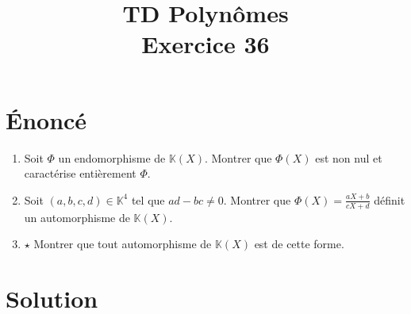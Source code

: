 \documentclass[french]{article}
\title{TD Polynômes \\ Exercice 36}
\date{}
\newcommand{\K}{\mathbb{K}}
\begin{document}
\maketitle

\section{Énoncé}
\begin{enumerate}
	\item Soit $\Phi$ un endomorphisme de $\K(X)$. Montrer que $\Phi(X)$ est non nul et caractérise entièrement $\Phi$.
	\item Soit $(a,b,c,d)\in\K^4$ tel que $ad-bc\ne 0$. Montrer que $\Phi(X)=\displaystyle\frac{aX+b}{cX+d}$ définit un automorphisme de $\K(X)$.
	\item $\star$ Montrer que tout automorphisme de $\K(X)$ est de cette forme.
\end{enumerate}
\section{Solution}
\end{document}
